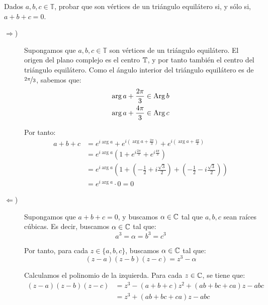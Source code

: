 \begin{ejercicio}
    Dados $a,b,c \in \mathbb{T}$, probar que son vértices de un triángulo equilátero si, y sólo si, $a+b+c = 0$.
    \begin{description}
        \item[$\Longrightarrow$)] Supongamos que $a,b,c\in \mathbb{T}$ son vértices de un triángulo equilátero.
        El origen del plano complejo es el centro $\mathbb{T}$, y por tanto también el centro del triángulo equilátero.
        Como el ángulo interior del triángulo equilátero es de $\nicefrac{2\pi}{3}$, sabemos que:
        \begin{align*}
            \arg a + \frac{2\pi}{3} &\in \operatorname{Arg} b\\
            \arg a + \frac{4\pi}{3} &\in \operatorname{Arg} c
        \end{align*}

        Por tanto:
        \begin{align*}
            a+b+c &= e^{i\arg a} + e^{i\left(\arg a + \frac{2\pi}{3}\right)} + e^{i\left(\arg a + \frac{4\pi}{3}\right)}\\
            &= e^{i\arg a}\left(1 + e^{i\frac{2\pi}{3}} + e^{i\frac{4\pi}{3}}\right)\\
            &= e^{i\arg a}\left(1 + \left(-\frac{1}{2} + i\frac{\sqrt{3}}{2}\right) + \left(-\frac{1}{2} - i\frac{\sqrt{3}}{2}\right)\right)\\
            &= e^{i\arg a}\cdot 0 = 0
        \end{align*}

        \item[$\Longleftarrow$)] Supongamos que $a+b+c = 0$, y buscamos $\alpha\in \mathbb{C}$ tal que $a,b,c$ sean raíces cúbicas. Es decir, buscamos $\alpha\in \mathbb{C}$ tal que:
        \begin{equation*}
            a^3=\alpha=b^3=c^3
        \end{equation*}

        Por tanto, para cada $z\in \{a,b,c\}$, buscamos $\alpha\in \mathbb{C}$ tal que:
        \begin{equation*}
            (z-a)(z-b)(z-c) = z^3 - \alpha
        \end{equation*}

        Calculamos el polinomio de la izquierda. Para cada $z\in \mathbb{C}$, se tiene que:
        \begin{align*}
            (z-a)(z-b)(z-c) &= z^3 - (a+b+c)z^2 + (ab+bc+ca)z - abc\\
            &= z^3 + (ab+bc+ca)z - abc
        \end{align*}


\end{description}
\end{ejercicio}
